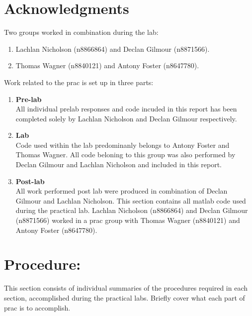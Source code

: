 \documentclass[11pt,a4paper]{article}
\begin{document}
\pagebreak
{\hypersetup{linkcolor=black} \tableofcontents}
\pagebreak
{\hypersetup{linkcolor=black} \listoffigures}

\pagebreak
\section{Acknowledgments}
Two groups worked in combination during the lab:
\begin{enumerate}
	\item Lachlan Nicholson (n8866864) and Declan Gilmour (n8871566).
	\item Thomas Wagner (n8840121) and Antony Foster (n8647780).
\end{enumerate}
Work related to the prac is set up in three parts:
\begin{enumerate}[label=\alph*)]
	\item \textbf{Pre-lab}\\
	All individual prelab responses and code incuded in this report has been completed solely by Lachlan Nicholson and Declan Gilmour respectively.
	\item \textbf{Lab}\\
	Code used within the lab predominanly belongs to Antony Foster and Thomas Wagner. All code beloning to this group was also performed by Declan Gilmour and Lachlan Nicholson and included in this report.
	\item \textbf{Post-lab}\\
	All work performed post lab were produced in combination of Declan Gilmour and Lachlan Nicholson.
	This section contains all matlab code used during the practical lab. Lachlan Nicholson (n8866864) and Declan Gilmour (n8871566) worked in a prac group with Thomas Wagner (n8840121) and Antony Foster (n8647780).\\
\end{enumerate}




\pagebreak
\section{Procedure:}
This section consists of individual summaries of the procedures required in each section, accomplished during the practical labs.
Briefly cover what each part of prac is to accomplish.
\end{document}
